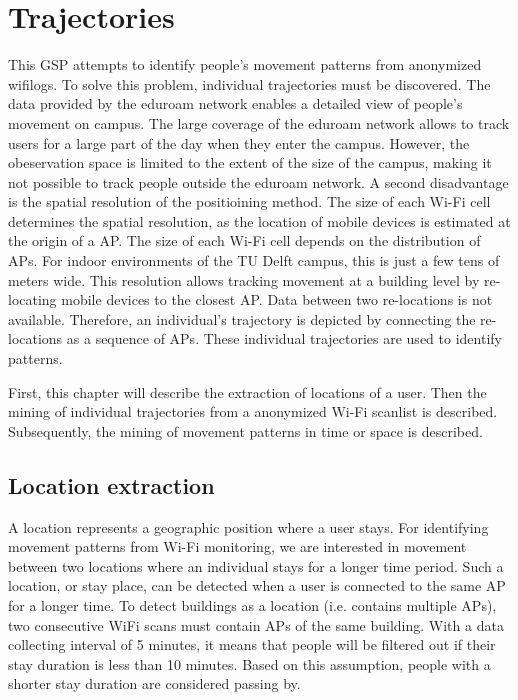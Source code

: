\section{Trajectories}\label{trajectories}
This GSP attempts to identify people’s movement patterns from anonymized wifilogs. To solve this problem, individual trajectories must be discovered. The data provided by the eduroam network enables a detailed view of people’s movement on campus. The large coverage of the eduroam network allows to track users for a large part of the day when they enter the campus. However, the obeservation space is limited to the extent of the size of the campus, making it not possible to track people outside the eduroam network. A second disadvantage is the spatial resolution of the positioining method. The size of each Wi-Fi cell determines the spatial resolution, as the location of mobile devices is estimated at the origin of a AP. The size of each Wi-Fi cell depends on the distribution of APs. For indoor environments of the TU Delft campus, this is just a few tens of meters wide. This resolution allows tracking movement at a building level by re-locating mobile devices to the closest AP. Data between two re-locations is not available. Therefore, an individual’s trajectory is depicted by connecting the re-locations as a sequence of APs. These individual trajectories are used to identify patterns. 

First, this chapter will describe the extraction of locations of a user. Then the mining of individual trajectories from a anonymized Wi-Fi scanlist is described. Subsequently, the mining of movement patterns in time or space is described. 

\subsection{Location extraction}
A location represents a geographic position where a user stays. For identifying movement patterns from Wi-Fi monitoring, we are interested in movement between two locations where an individual stays for a longer time period. Such a location, or stay place, can be detected when a user is connected to the same AP for a longer time. To detect  buildings as a location (i.e. contains multiple APs), two consecutive WiFi scans must contain  APs of the same building. With a data collecting interval of 5 minutes, it means that people will be filtered out if their stay duration is less than 10 minutes. Based on this assumption, people with a shorter stay duration are considered passing by.

